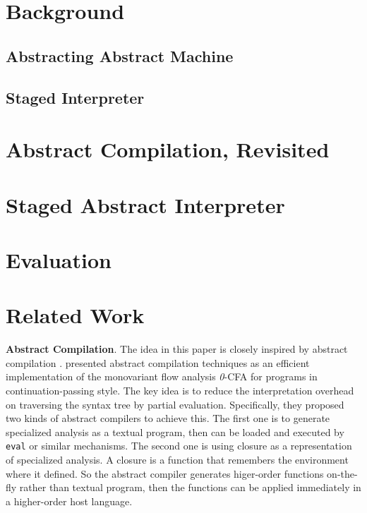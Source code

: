 \documentclass[acmsmall,review,anonymous]{acmart}\settopmatter{printfolios=true,printccs=false,printacmref=false}
\begin{document}
\section{Background}

\subsection{Abstracting Abstract Machine}

\subsection{Staged Interpreter}

\section{Abstract Compilation, Revisited}

\section{Staged Abstract Interpreter}

\section{Evaluation}

\section{Related Work}

\textbf{Abstract Compilation}. The idea in this paper is closely inspired by 
abstract compilation \cite{Boucher:1996:ACN:647473.727587}.
\citeauthor{Boucher:1996:ACN:647473.727587} presented abstract compilation
techniques as an efficient implementation of the monovariant flow analysis 
\textit{0}-CFA for programs in continuation-passing style. The key idea is to 
reduce the interpretation overhead on traversing the syntax tree by partial evaluation.
Specifically, they proposed two kinds of abstract compilers to achieve this. 
The first one is to generate specialized analysis as a textual program, then 
can be loaded and executed by \texttt{eval} or similar mechanisms. The second 
one is using closure as a representation of specialized analysis. 
A closure is a function that remembers the environment where it defined. So the 
abstract compiler generates higer-order functions on-the-fly rather than textual 
program, then the functions can be applied immediately in a higher-order host language.
\end{document}
